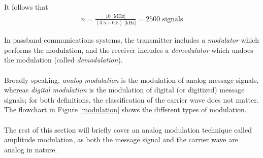 \documentclass{report}
\begin{document}
\begin{solution}
    It follows that 
    \begin{align*}
        n = \frac{10\text{ [MHz]}}{(3.5 + 0.5)\text{ [kHz]}} = 2500 \text{ signals}
    \end{align*}
\end{solution}
In passband communications systems, the transmitter includes a \emph{modulator} which performs the modulation, and the receiver includes a \emph{demodulator} which undoes the modulation (called \emph{demodulation}).
\\ \\ 
Broadly speaking, \emph{analog modulation} is the modulation of analog message signals, whereas \emph{digital modulation} is the modulation of 
digital (or digitized) message signals; for both definitions, the classification of the carrier wave does not matter. The flowchart in Figure \ref{modulation} 
shows the different types of modulation.
\\ \\
The rest of this section will briefly cover an analog modulation technique called amplitude modulation, as both the message signal and the carrier wave are analog in nature.

\pagebreak
\end{document}
